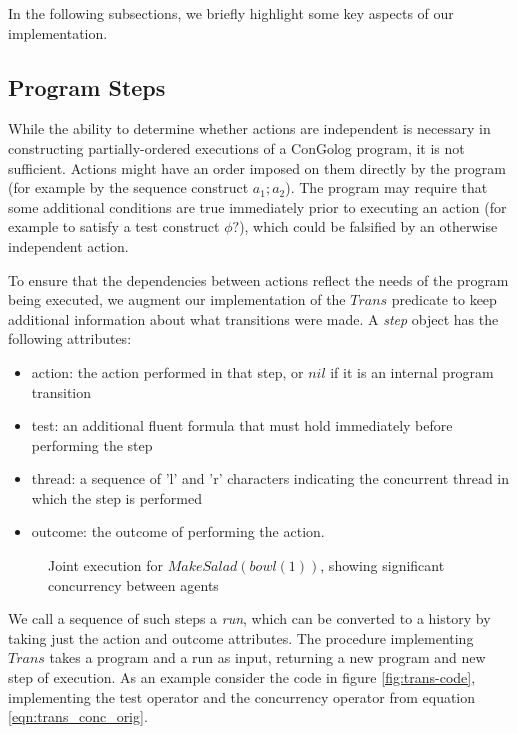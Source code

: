 In the following subsections, we briefly highlight some key aspects
of our implementation.


\subsection{Program Steps}

While the ability to determine whether actions are independent is
necessary in constructing partially-ordered executions of a ConGolog
program, it is not sufficient. Actions might have an order imposed
on them directly by the program (for example by the sequence construct
$a_{1};a_{2}$). The program may require that some additional conditions
are true immediately prior to executing an action (for example to
satisfy a test construct $\phi?$), which could be falsified by an
otherwise independent action.

To ensure that the dependencies between actions reflect the needs
of the program being executed, we augment our implementation of the
$Trans$ predicate to keep additional information about what transitions
were made. A \emph{step }object has the following attributes:

\begin{itemize}
\item action: the action performed in that step, or $nil$ if it is an internal
program transition
\item test: an additional fluent formula that must hold immediately before
performing the step
\item thread: a sequence of 'l' and 'r' characters indicating the concurrent
thread in which the step is performed
\item outcome: the outcome of performing the action.
\end{itemize}
%
\begin{figure}
%

\caption{
Joint execution for $MakeSalad(bowl(1))$, showing significant concurrency
between agents
}
\label{fig:plan-output}
\end{figure}


We call a sequence of such steps a \emph{run}, which can be converted
to a history by taking just the action and outcome attributes. The
procedure implementing $Trans$ takes a program and a run as input,
returning a new program and new step of execution. As an example consider
the code in figure \ref{fig:trans-code}, implementing the test operator
and the concurrency operator from equation \ref{eqn:trans_conc_orig}.


